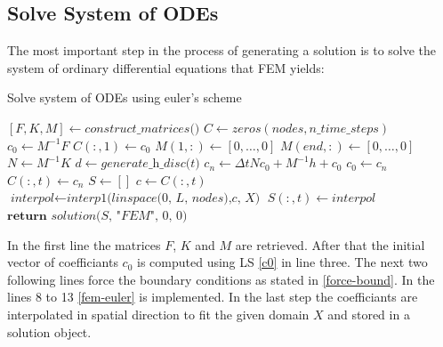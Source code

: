 \subsection{Solve System of ODEs}
The most important step in the process of generating a solution is to solve the system of ordinary differential equations that FEM yields:
\begin{algorithm}[H]
\caption{Solve system of ODEs using euler's scheme}
\begin{algorithmic}[1]
\State $[F, K, M] \gets \textit{construct\_matrices()}$
\State $C \gets zeros(nodes, n\_time\_steps)$
\State $c_{0} \gets M^{-1}F$
\State $C(:, 1) \gets c_{0}$
\State $M(1, :) \gets [0, \hdots, 0]$
\State $M(end, :) \gets [0, \hdots, 0]$
\State $N \gets M^{-1}K$
\State $d \gets \textit{generate\_h\_disc(t)}$
\State $c_{n} \gets \Delta t N c_{0} + M^{-1} h + c_{0} $
\State $c_{0} \gets c_{n}$
\State $C(:, t) \gets c_{n}$
\EndFor
\State $S \gets []$
\State $c \gets C(:, t)$
\State $\textit{interpol} \gets \textit{interp1(linspace(0, L, nodes),c, X)}$
\State $S(:, t) \gets \textit{interpol}$
\EndFor
\State $\textbf{return } \textit{solution(S, "FEM", 0, 0)}$
\end{algorithmic}
\end{algorithm}
In the first line the matrices \(F\), \(K\) and \(M\) are retrieved.
After that the initial vector of coefficiants \(c_0\) is computed using LS \ref{c0} in line three.
The next two following lines force the boundary conditions as stated in \ref{force-bound}.
In the lines 8 to 13 \ref{fem-euler} is implemented.
In the last step the coefficiants are interpolated in spatial direction to fit the given domain \(X\) and stored in a solution object.


	



